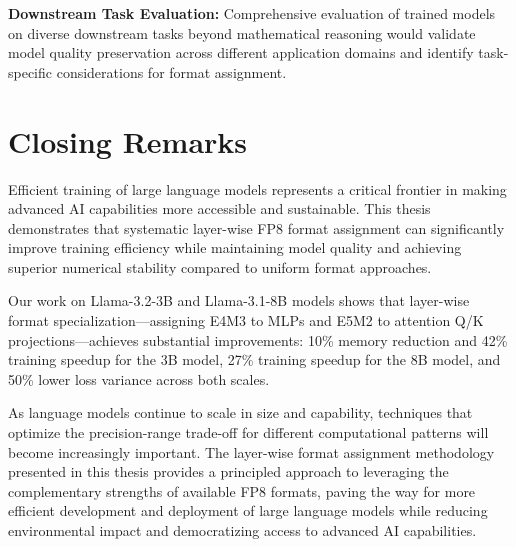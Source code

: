 \textbf{Downstream Task Evaluation:} Comprehensive evaluation of trained models on diverse downstream tasks beyond mathematical reasoning would validate model quality preservation across different application domains and identify task-specific considerations for format assignment.
\section*{Closing Remarks}

Efficient training of large language models represents a critical frontier in making advanced AI capabilities more accessible and sustainable. This thesis demonstrates that systematic layer-wise FP8 format assignment can significantly improve training efficiency while maintaining model quality and achieving superior numerical stability compared to uniform format approaches.

Our work on Llama-3.2-3B and Llama-3.1-8B models shows that layer-wise format specialization—assigning E4M3 to MLPs and E5M2 to attention Q/K projections—achieves substantial improvements: 10\% memory reduction and 42\% training speedup for the 3B model, 27\% training speedup for the 8B model, and 50\% lower loss variance across both scales.

As language models continue to scale in size and capability, techniques that optimize the precision-range trade-off for different computational patterns will become increasingly important. The layer-wise format assignment methodology presented in this thesis provides a principled approach to leveraging the complementary strengths of available FP8 formats, paving the way for more efficient development and deployment of large language models while reducing environmental impact and democratizing access to advanced AI capabilities.